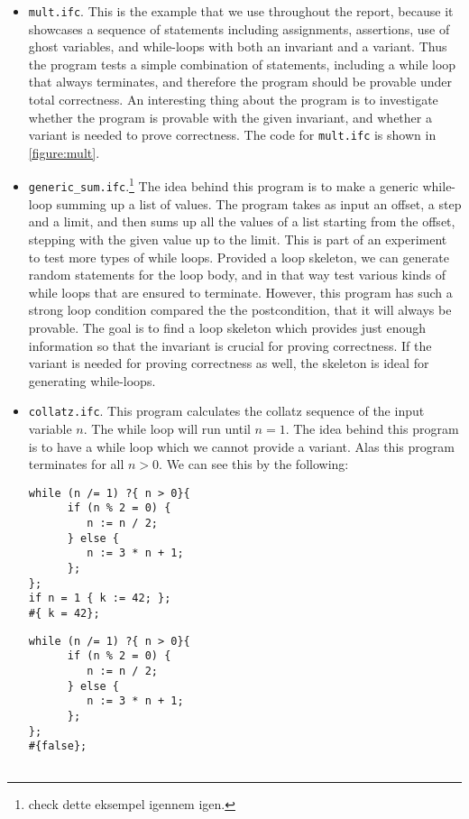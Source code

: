 \begin{itemize}
  \item {\texttt{mult.ifc}.} 
  This is the example that we use throughout the report, because it showcases a sequence of statements including assignments, assertions, use of ghost variables, and while-loops with both an invariant and a variant.
  Thus the program tests a simple combination of statements, including a while loop that always terminates, and therefore the program should be provable under total correctness.
  An interesting thing about the program is to investigate whether the program is provable with the given invariant, and whether a variant is needed to prove correctness.
  The code for \texttt{mult.ifc} is shown in \cref{figure:mult}.
  
  \item{\texttt{generic\_sum.ifc}.}\footnote{check dette eksempel igennem igen.}
  The idea behind this program is to make a generic while-loop summing up a list of values. 
  The program takes as input an offset, a step and a limit, and then sums up all the values of a list starting from the offset, stepping with the given value up to the limit.
  This is part of an experiment to test more types of while loops. Provided a loop skeleton, we can generate random statements for the loop body, and in that way test various kinds of while loops that are ensured to terminate.
  However, this program has such a strong loop condition compared the the postcondition, that it will always be provable.
  The goal is to find a loop skeleton which provides just enough information so that the invariant is crucial for proving correctness. If the variant is needed for proving correctness as well, the skeleton is ideal for generating while-loops.
  
  \item{\texttt{collatz.ifc}.}
  This program calculates the collatz sequence of the input variable $n$. The while loop will run until $n = 1$.
        The idea behind this program is to have a while loop which we cannot provide a variant. Alas this program terminates for all $n > 0$. We can see this by the following:

\begin{minipage}[t]{0.4\textwidth}
  \begin{lstlisting}
while (n /= 1) ?{ n > 0}{
      if (n % 2 = 0) {
         n := n / 2;
      } else {
         n := 3 * n + 1;
      };
};
if n = 1 { k := 42; };
#{ k = 42};
\end{lstlisting}
\end{minipage}
\begin{minipage}[t]{0.4\textwidth}
  \begin{lstlisting}
while (n /= 1) ?{ n > 0}{
      if (n % 2 = 0) {
         n := n / 2;
      } else {
         n := 3 * n + 1;
      };
};
#{false};


\end{lstlisting}
\end{minipage}
\end{itemize}
